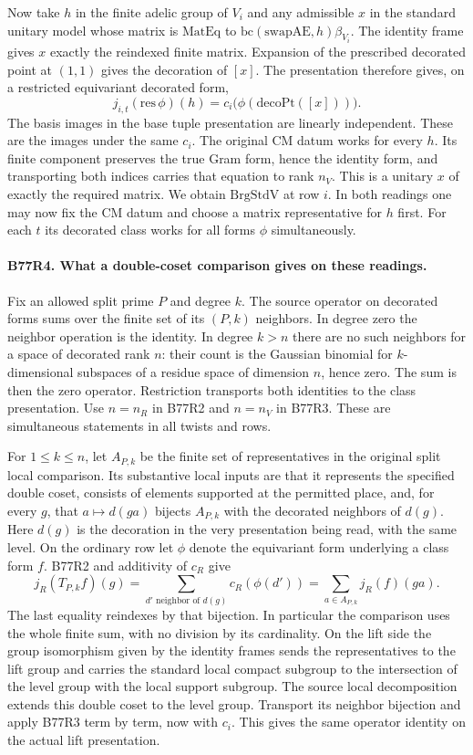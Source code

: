 Now take $h$ in the finite adelic group of $V_i$ and any admissible
$x$ in the standard unitary model whose matrix is
$\mathrm{MatEq}$ to $\mathrm{bc}(\mathrm{swapAE},h)\beta_{V_i}$.
The identity frame gives $x$ exactly the reindexed finite matrix.
Expansion of the prescribed decorated point at $(1,1)$ gives the
decoration of $[x]$. The presentation therefore gives, on a
restricted equivariant decorated form,
\[
 j_{i,t}(\mathrm{res}\,\phi)(h)
           = c_i\bigl(\phi(\mathrm{decoPt}([x]))\bigr).
\]
The basis images in the base tuple presentation are linearly
independent. These are the images under the same $c_i$. The
original CM datum works for every $h$. Its finite component preserves the true Gram form, hence the
identity form, and transporting both indices carries that equation
to rank $n_V$. This is a unitary $x$ of exactly the required matrix.
We obtain $\mathrm{BrgStdV}$ at row $i$. In both readings one
may now fix the CM datum and choose a matrix representative for
$h$ first. For each $t$ its decorated class works for all forms
$\phi$ simultaneously.

\paragraph{B77R4. What a double-coset comparison gives on these readings.}
Fix an allowed split prime $P$ and degree $k$. The source operator
on decorated forms sums over the finite set of its $(P,k)$
neighbors. In degree zero the neighbor operation is the identity.
In degree $k>n$ there are no such neighbors for a space of decorated
rank $n$: their count is the Gaussian binomial for $k$-dimensional
subspaces of a residue space of dimension $n$, hence zero. The sum
is then the zero operator. Restriction transports both identities
to the class presentation. Use $n=n_R$ in B77R2 and $n=n_V$ in
B77R3. These are simultaneous statements in all twists and rows.

For $1\le k\le n$, let $A_{P,k}$ be the finite set of representatives
in the original split local comparison. Its substantive local inputs
are that it represents the specified double coset, consists of
elements supported at the permitted place, and, for every $g$, that
$a\mapsto d(ga)$ bijects $A_{P,k}$ with the decorated neighbors
of $d(g)$. Here $d(g)$ is the decoration in the very presentation
being read, with the same level. On the ordinary row let
$\phi$ denote the equivariant form underlying a class form $f$.
B77R2 and additivity of $c_R$ give
\[
  j_R(T_{P,k} f)(g)
   =\sum_{d'\text{ neighbor of }d(g)} c_R(\phi(d'))
   =\sum_{a\in A_{P,k}} j_R(f)(ga).
\]
The last equality reindexes by that bijection. In particular the
comparison uses the whole finite sum, with no division by its
cardinality. On the lift side the group isomorphism given by the
identity frames sends the representatives to the lift group and
carries the standard local compact subgroup to the intersection
of the level group with the local support subgroup. The source
local decomposition extends this double coset to the level
group. Transport its neighbor bijection and apply B77R3 term by
term, now with $c_i$. This gives the same operator identity on
the actual lift presentation.

